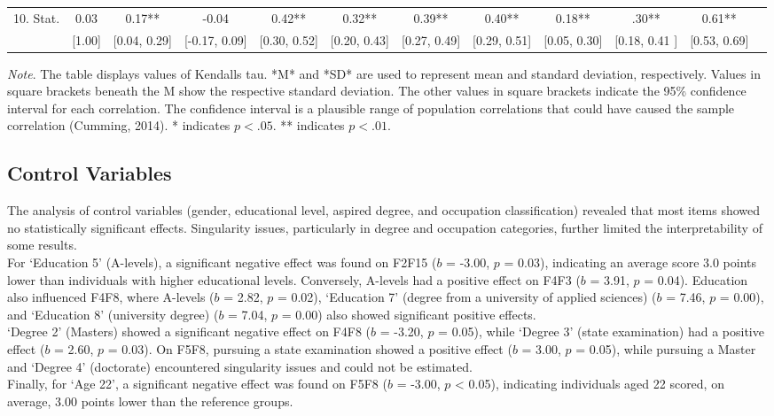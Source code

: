\documentclass[
  12pt,
  a4paper,
  twoside]{article}
\begin{document}
\begin{table}[htbp]
{\begin{minipage}{\textheight}
\begin{tabular}{lccccccccccc}
10. Stat. & 0.03 & 0.17** & -0.04 & 0.42** & 0.32** & 0.39** & 0.40** & 0.18** & .30** & 0.61** \\
   & [1.00] & [0.04, 0.29] & [-0.17, 0.09] & [0.30, 0.52] & [0.20, 0.43] & [0.27, 0.49] & [0.29, 0.51] & [0.05, 0.30]& [0.18, 0.41 ] & [0.53, 0.69] \\
\hline
\end{tabular}
\par %
\small\textit{Note}. The table displays values of Kendalls tau. *M* and *SD* are used to represent mean and standard deviation, respectively. Values in square brackets beneath the M show the respective standard deviation. The other values in square brackets indicate the 95\% confidence interval for each correlation. The confidence interval is a plausible range of population correlations that could have caused the sample correlation (Cumming, 2014). * indicates $p < .05$. ** indicates $p < .01$.
\end{minipage}%
}
\end{table}

\subsection{Control Variables}\label{control-variables}

The analysis of control variables (gender, educational level, aspired degree, and occupation classification) revealed that most items showed no statistically significant effects. Singularity issues, particularly in degree and occupation categories, further limited the interpretability of some results.\\
For `Education 5' (A-levels), a significant negative effect was found on F2F15 (\(b\) = -3.00, \(p\) = 0.03), indicating an average score 3.0 points lower than individuals with higher educational levels. Conversely, A-levels had a positive effect on F4F3 (\(b\) = 3.91, \(p\) = 0.04). Education also influenced F4F8, where A-levels (\(b\) = 2.82, \(p\) = 0.02), `Education 7' (degree from a university of applied sciences) (\(b\) = 7.46, \(p\) = 0.00), and `Education 8' (university degree) (\(b\) = 7.04, \(p\) = 0.00) also showed significant positive effects.\\
`Degree 2' (Masters) showed a significant negative effect on F4F8 (\(b\) = -3.20, \(p\) = 0.05), while `Degree 3' (state examination) had a positive effect (\(b\) = 2.60, \(p\) = 0.03). On F5F8, pursuing a state examination showed a positive effect (\(b\) = 3.00, \(p\) = 0.05), while pursuing a Master and `Degree 4' (doctorate) encountered singularity issues and could not be estimated.\\
Finally, for `Age 22', a significant negative effect was found on F5F8 (\(b\) = -3.00, \(p\) \textless{} 0.05), indicating individuals aged 22 scored, on average, 3.00 points lower than the reference groups.
\end{document}
